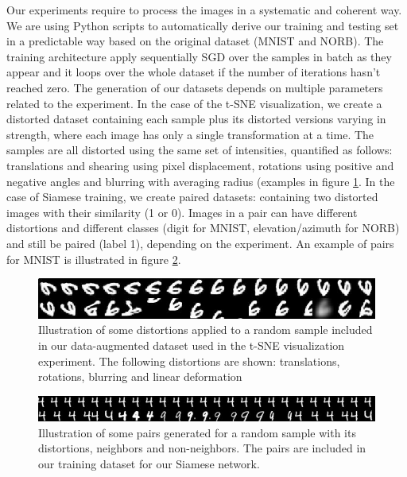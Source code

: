 \documentclass[a4paper,12pt]{report}
\begin{document}
Our experiments require to process the images in a systematic and coherent way.
We are using Python scripts to automatically derive our training and testing set in a predictable way based on the original dataset (MNIST and NORB).
The training architecture apply sequentially SGD over the samples in batch as they appear and it loops over the whole dataset if the number of iterations hasn't reached zero.
The generation of our datasets depends on multiple parameters related to the experiment.
In the case of the t-SNE visualization, we create a distorted dataset containing each sample plus its distorted versions varying in strength, where each image has only a single transformation at a time.
The samples are all distorted using the same set of intensities, quantified as follows: translations and shearing using pixel displacement, rotations using positive and negative angles and blurring with averaging radius (examples in figure \ref{fig:mnist_transfo_tsne}.
In the case of Siamese training, we create paired datasets: containing two distorted images with their similarity (1 or 0).
Images in a pair can have different distortions and different classes (digit for MNIST, elevation/azimuth for NORB) and still be paired (label 1), depending on the experiment.
An example of pairs for MNIST is illustrated in figure \ref{fig:mnist_pairs}.

\begin{figure}[t]
    \begin{center}
        \includegraphics{thesis_figures/mnist_transfo_tsne.jpg}
    \end{center}
    \caption{Illustration of some distortions applied to a random sample included in our data-augmented dataset used in the t-SNE visualization experiment. The following distortions are shown: translations, rotations, blurring and linear deformation}
    \label{fig:mnist_transfo_tsne}
\end{figure}

\begin{figure}[t]
    \begin{center}
        \includegraphics{thesis_figures/mnist_pairs.jpg}
    \end{center}
    \caption{Illustration of some pairs generated for a random sample with its distortions, neighbors and non-neighbors. The pairs are included in our training dataset for our Siamese network.}
    \label{fig:mnist_pairs}
\end{figure}
\end{document}
